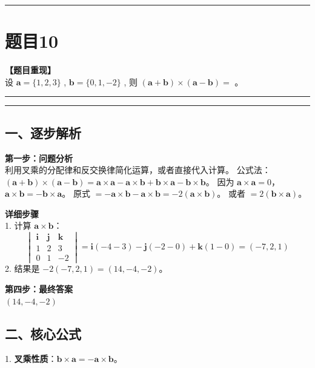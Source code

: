 \documentclass[12pt, a4paper]{ctexart}
\newcommand{\TopSeparator}{
    \par\noindent\rule{\textwidth}{1.5pt}\vspace{0.5em} %
}
\newcommand{\AnalysisSeparator}{
    \par\noindent\rule{\textwidth}{0.5pt}\vspace{0.2em}\hrule\vspace{0.5em} %
}
\newenvironment{RedAnalysis}{
    \par
    \color{red} %
}{
    \par
    \color{black} %
}
\begin{document}
\vspace{2em}

\TopSeparator
\section*{题目10}

\textbf{【题目重现】} \\
设 $ \mathbf{a} = \{1, 2, 3\} $ , $ \mathbf{b} = \{0, 1, -2\} $ , 则 $ (\mathbf{a} + \mathbf{b}) \times (\mathbf{a} - \mathbf{b}) = $ \underline{\hspace{2cm}}。

\AnalysisSeparator

\begin{RedAnalysis}

\subsection*{一、逐步解析}

\textbf{第一步：问题分析} \\
利用叉乘的分配律和反交换律简化运算，或者直接代入计算。
公式法：$(\mathbf{a}+\mathbf{b})\times(\mathbf{a}-\mathbf{b}) = \mathbf{a}\times\mathbf{a} - \mathbf{a}\times\mathbf{b} + \mathbf{b}\times\mathbf{a} - \mathbf{b}\times\mathbf{b}$。
因为 $\mathbf{a}\times\mathbf{a}=0$，$\mathbf{a}\times\mathbf{b} = -\mathbf{b}\times\mathbf{a}$。
原式 $= - \mathbf{a}\times\mathbf{b} - \mathbf{a}\times\mathbf{b} = -2 (\mathbf{a}\times\mathbf{b})$。
或者 $= 2(\mathbf{b} \times \mathbf{a})$。

\textbf{详细步骤} \\
1. 计算 $\mathbf{a} \times \mathbf{b}$：
   \[ \begin{vmatrix} \mathbf{i} & \mathbf{j} & \mathbf{k} \\ 1 & 2 & 3 \\ 0 & 1 & -2 \end{vmatrix} = \mathbf{i}(-4-3) - \mathbf{j}(-2-0) + \mathbf{k}(1-0) = (-7, 2, 1) \]
2. 结果是 $-2(-7, 2, 1) = (14, -4, -2)$。

\textbf{第四步：最终答案} \\
$ (14, -4, -2) $

\subsection*{二、核心公式}
1. \textbf{叉乘性质}：$\mathbf{b} \times \mathbf{a} = - \mathbf{a} \times \mathbf{b}$。

\end{RedAnalysis}
\end{document}
